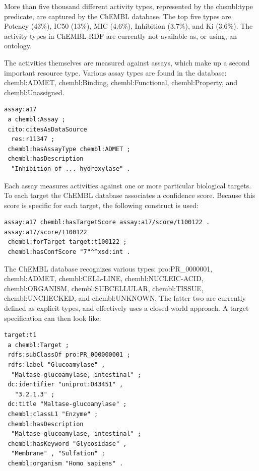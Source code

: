 \documentclass[10pt]{bmc_article}
\newenvironment{bmcformat}{\begin{raggedright}\baselineskip20pt\sloppy\setboolean{publ}{false}}{\end{raggedright}\baselineskip20pt\sloppy}
\begin{document}
\begin{bmcformat}
More than five thousand different activity types, represented by the chembl:type predicate,
are captured by the ChEMBL database.
The top five types are Potency (43\%), IC50 (13\%), MIC (4.6\%), Inhibition (3.7\%),
and Ki (3.6\%). The activity types in ChEMBL-RDF are currently not available as, or
using, an ontology.

The activities themselves are measured against assays, which make up a second important
resource type. Various assay types are found in the database: chembl:ADMET, chembl:Binding,
chembl:Functional, chembl:Property, and chembl:Unassigned.

\begin{small}
\begin{verbatim}
assay:a17
 a chembl:Assay ;
 cito:citesAsDataSource
  res:r11347 ;
 chembl:hasAssayType chembl:ADMET ;
 chembl:hasDescription
  "Inhibition of ... hydroxylase" .
\end{verbatim}
\end{small}

Each assay measures activities against one or more particular biological targets. To each
target the ChEMBL database associates a confidence score. Because this score is specific
for each target, the following construct is used:

\begin{small}
\begin{verbatim}
assay:a17 chembl:hasTargetScore assay:a17/score/t100122 .
assay:a17/score/t100122
 chembl:forTarget target:t100122 ;
 chembl:hasConfScore "7"^^xsd:int .  
\end{verbatim}
\end{small}

The ChEMBL database
recognizes various types: pro:PR\_0000001, chembl:ADMET, chembl:CELL-LINE,
chembl:NUCLEIC-ACID, chembl:ORGANISM, chembl:SUBCELLULAR, chembl:TISSUE,
chembl:UNCHECKED, and chembl:UNKNOWN. The latter two are currently defined as
explicit types, and effectively uses a closed-world approach. A target
specification can then look like:

\begin{small}
\begin{verbatim}
target:t1
 a chembl:Target ;
 rdfs:subClassOf pro:PR_000000001 ;
 rdfs:label "Glucoamylase" , 
  "Maltase-glucoamylase, intestinal" ;
 dc:identifier "uniprot:O43451" ,
   "3.2.1.3" ;
 dc:title "Maltase-glucoamylase" ;
 chembl:classL1 "Enzyme" ;
 chembl:hasDescription
  "Maltase-glucoamylase, intestinal" ;
 chembl:hasKeyword "Glycosidase" , 
  "Membrane" , "Sulfation" ;
 chembl:organism "Homo sapiens" .
\end{verbatim}
\end{small}


\end{bmcformat}
\end{document}
